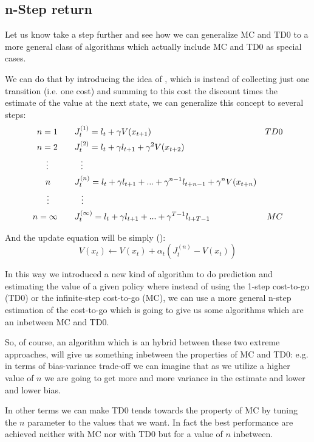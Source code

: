 \subsection{n-Step return}
Let us know take a step further and see how we can generalize MC and TD0 to a more general class of algorithms which actually include MC and TD0 as special cases.

We can do that by introducing the idea of , which is instead of collecting just one transition (i.e. one cost) and summing  to this cost the discount times the estimate of the value at the next state, we can generalize this concept to several steps:
\begin{align*}
n=1 &\qquad J_t^{(1)} = l_t + \gamma V(x_{t+1})&TD0\\
n=2 & \qquad J_t^{(2)} = l_t + \gamma l_{t+1} + \gamma^2 V(x_{t+2})&\\
\vdotswithin{n=2} &\qquad\vdotswithin{J_t^{(2)}}&\\
n\hphantom{\,\,2} & \qquad J_t^{(n)} = l_t + \gamma l_{t+1} + ... + \gamma^{n-1} l_{t+n-1} + \gamma^{n}V(x_{t+n})&\\
\vdotswithin{n}\hphantom{\,\,2}&\qquad\vdotswithin{J_t^{(n)}}&\\
n=\infty&\qquad J_t^{(\infty)} = l_t + \gamma l_{t+1} + ... + \gamma^{T-1} l_{t+T-1}&MC
\end{align*}

And the update equation will be simply ():
\[V(x_t) \leftarrow V(x_t) + \alpha_t (J_t^{(n)} - V(x_t))\]

In this way we introduced a new kind of algorithm to do prediction and estimating the value of a given policy where instead of using the 1-step cost-to-go (TD0) or the infinite-step cost-to-go (MC), we can use a more general n-step estimation of the cost-to-go which is going to give us some algorithms which are an inbetween MC and TD0.

So, of course, an algorithm which is an hybrid between these two extreme approaches, will give us something inbetween the properties of MC and TD0: e.g. in terms of bias-variance trade-off we can imagine that as we utilize a higher value of $n$ we are going to get more and more variance in the estimate and lower and lower bias.

In other terms we can make TD0 tends towards the property of MC by tuning the $n$ parameter to the values that we want.
In fact the best performance are achieved neither with MC nor with TD0 but for a value of $n$ inbetween.

